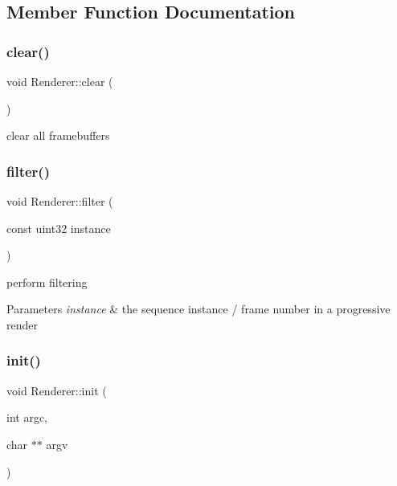 \subsection{Member Function Documentation}
\mbox{\label{struct_renderer_ac46720b3fc0dbb2fc37674766490a8c4}} 
\subsubsection{\texorpdfstring{clear()}{clear()}}
{\footnotesize\ttfamily void Renderer\+::clear (\begin{DoxyParamCaption}{ }\end{DoxyParamCaption})}

clear all framebuffers \mbox{\label{struct_renderer_a6d93cf5fc9b7e96d3d52e98e03c436e1}} 
\subsubsection{\texorpdfstring{filter()}{filter()}}
{\footnotesize\ttfamily void Renderer\+::filter (\begin{DoxyParamCaption}\item[{const uint32}]{instance }\end{DoxyParamCaption})}

perform filtering


\begin{DoxyParams}{Parameters}
{\em instance} & the sequence instance / frame number in a progressive render \\
\hline
\end{DoxyParams}
\mbox{\label{struct_renderer_a6d1211c5c08f587f0a3dde83cf6749e0}} 
\subsubsection{\texorpdfstring{init()}{init()}}
{\footnotesize\ttfamily void Renderer\+::init (\begin{DoxyParamCaption}\item[{int}]{argc,  }\item[{char $\ast$$\ast$}]{argv }\end{DoxyParamCaption})}

